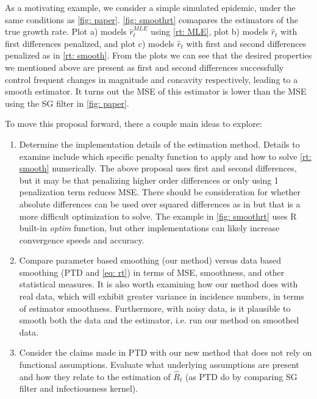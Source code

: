 \documentclass[12pt]{article}
\begin{document}
      As a motivating example, we consider a simple simulated epidemic, under the same conditions as \cref{fig: paper}. \cref{fig: smoothrt} comapares the estimators
      of the true growth rate. Plot a) models $\hat{r}_t^{MLE}$ using \cref{rt: MLE}, plot b) models $\hat{r}_t$ with first differences penalized, 
      and plot c) models $\hat{r}_t$ with first and second differences penalized as in \cref{rt: smooth}. From the plots we can see that the desired properties 
      we mentioned above are present as first and second differences successfully control frequent changes in magnitude and concavity respectively, 
      leading to a smooth estimator. It turns out the MSE of this estimator is lower than the MSE using the SG filter in \cref{fig: paper}.

      To move this proposal forward, there a couple main ideas to explore:
      \begin{enumerate}
          \item Determine the implementation details of the estimation method. Details to examine include which specific penalty function to apply and
          how to solve \cref{rt: smooth} numerically. The above proposal uses first and second differences, but it may be that penalizing higher order
          differences or only using 1 penalization term reduces MSE. There should be consideration for whether absolute differences can be used
          over squared differences as in \citep{Liu2024} but that is a more difficult optimization to solve. The example in \cref{fig: smoothrt}
          uses R built-in \textit{optim} function, but other implementations can likely increase convergence speeds and accuracy.
          \item Compare parameter based smoothing (our method) versus data based smoothing (PTD and \cref{eq: rt}) in terms of MSE, smoothness, and 
          other statistical measures. It is also worth examining how our method does with real data, which will exhibit greater variance in incidence numbers,
          in terms of estimator smoothness. Furthermore, with noisy data, is it plausible to smooth both the data and the estimator, i.e. run our method
          on smoothed data.
          \item Consider the claims made in PTD with our new method that does not rely on functional assumptions. Evaluate what underlying assumptions are 
          present and how they relate to the estimation of $\hat{R}_t$ (as PTD do by comparing SG filter and infectiousness kernel).
      \end{enumerate}
\end{document}
